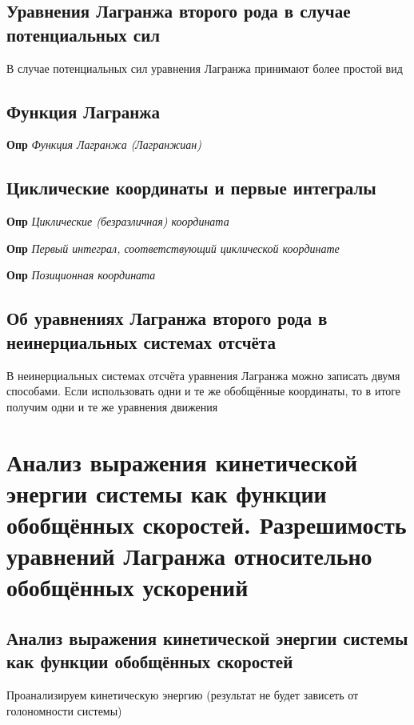 \documentclass[a4paper, 14pt]{article}
\begin{document}
    \subsection{Уравнения Лагранжа второго рода в случае потенциальных сил}
    
    В случае потенциальных сил уравнения Лагранжа принимают более простой вид
    
    \subsection{Функция Лагранжа}
    
    \textbf{Опр} \textit{Функция Лагранжа (Лагранжиан)}
    
    \subsection{Циклические координаты и первые интегралы}
    
    \textbf{Опр} \textit{Циклические (безразличная) координата}
    
    \textbf{Опр} \textit{Первый интеграл, соответствующий циклической координате}
    
    \textbf{Опр} \textit{Позиционная координата}
    
    \subsection{Об уравнениях Лагранжа второго рода в неинерциальных системах отсчёта}
    
    В неинерциальных системах отсчёта уравнения Лагранжа можно записать двумя способами.
    Если использовать одни и те же обобщённые координаты, то в итоге получим одни и те же уравнения движения
    
    \section{Анализ выражения кинетической энергии системы как функции обобщённых скоростей.
    Разрешимость уравнений Лагранжа относительно обобщённых ускорений}
    
    \subsection{Анализ выражения кинетической энергии системы как функции обобщённых скоростей}
    
    Проанализируем кинетическую энергию (результат не будет зависеть от голономности системы)
    
\end{document}
